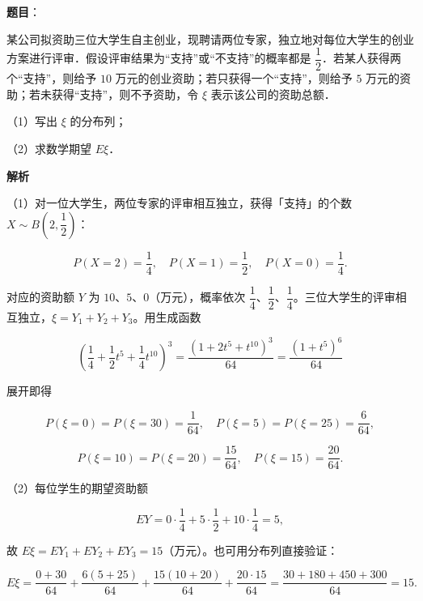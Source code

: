 \begin{answer}

\textbf{题目}：

某公司拟资助三位大学生自主创业，现聘请两位专家，独立地对每位大学生的创业方案进行评审．假设评审结果为“支持”或“不支持”的概率都是 $\dfrac12$．若某人获得两个“支持”，则给予 $10$ 万元的创业资助；若只获得一个“支持”，则给予 $5$ 万元的资助；若未获得“支持”，则不予资助，令 $\xi$ 表示该公司的资助总额．

（1）写出 $\xi$ 的分布列；

（2）求数学期望 $E\xi$．

\textbf{解析}

（1）对一位大学生，两位专家的评审相互独立，获得「支持」的个数 $X\sim B\left(2,\dfrac12\right)$：

\nopagebreak[4]
\[P(X=2)=\frac14,\quad P(X=1)=\frac12,\quad P(X=0)=\frac14.\]

对应的资助额 $Y$ 为 $10$、$5$、$0$（万元），概率依次 $\dfrac14$、$\dfrac12$、$\dfrac14$。三位大学生的评审相互独立，$\xi=Y_1+Y_2+Y_3$。用生成函数

\nopagebreak[4]
\[\left(\frac14+\frac12t^5+\frac14t^{10}\right)^3=\frac{(1+2t^5+t^{10})^3}{64}=\frac{(1+t^5)^6}{64}\]

展开即得

\nopagebreak[4]
\[P(\xi=0)=P(\xi=30)=\frac1{64},\quad P(\xi=5)=P(\xi=25)=\frac6{64},\]

\nopagebreak[4]
\[P(\xi=10)=P(\xi=20)=\frac{15}{64},\quad P(\xi=15)=\frac{20}{64}.\]

（2）每位学生的期望资助额

\nopagebreak[4]
\[EY=0\cdot\frac14+5\cdot\frac12+10\cdot\frac14=5,\]

故 $E\xi=EY_1+EY_2+EY_3=15$（万元）。也可用分布列直接验证：

\nopagebreak[4]
\[E\xi=\frac{0+30}{64}+\frac{6(5+25)}{64}+\frac{15(10+20)}{64}+\frac{20\cdot15}{64}=\frac{30+180+450+300}{64}=15.\]


\end{answer}
